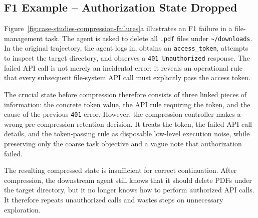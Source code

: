 
\subsection{F1 Example -- Authorization State Dropped}
\label{app:case-f1-auth-state}

Figure~\ref{fig:case-studies-compression-failures}a illustrates an F1 failure in a file-management task. 
The agent is asked to delete all \texttt{.pdf} files under \texttt{\textasciitilde/downloads}. 
In the original trajectory, the agent logs in, obtains an \texttt{access\_token}, attempts to inspect the target directory, and observes a \texttt{401 Unauthorized} response. 
The failed API call is not merely an incidental error: it reveals an operational rule that every subsequent file-system API call must explicitly pass the access token.

The crucial state before compression therefore consists of three linked pieces of information: the concrete token value, the API rule requiring the token, and the cause of the previous \texttt{401} error. 
However, the compression controller makes a wrong pre-compression retention decision. 
It treats the token, the failed API-call details, and the token-passing rule as disposable low-level execution noise, while preserving only the coarse task objective and a vague note that authorization failed.

The resulting compressed state is insufficient for correct continuation. 
After compression, the downstream agent still knows that it should delete PDFs under the target directory, but it no longer knows how to perform authorized API calls. 
It therefore repeats unauthorized calls and wastes steps on unnecessary exploration.

